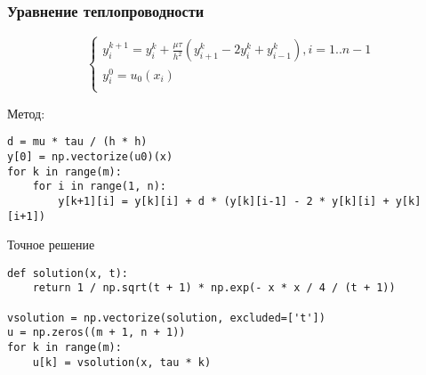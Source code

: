 \documentclass[10pt]{beamer}
\begin{document}
\begin{frame}[fragile]
\frametitle{Уравнение теплопроводности}
$$
\begin{cases}
y^{k+1}_i = y^k_i + \frac{\mu \tau}{h^2} ( y^{k}_{i+1} - 2 y^k_i + y^{k}_{i-1}), i = 1..n-1\\
y_i^0 = u_0(x_i)\\
\end{cases}
$$

Метод:
\begin{lstlisting}
d = mu * tau / (h * h) 
y[0] = np.vectorize(u0)(x)
for k in range(m):
    for i in range(1, n):
        y[k+1][i] = y[k][i] + d * (y[k][i-1] - 2 * y[k][i] + y[k][i+1])
\end{lstlisting}

Точное решение
\begin{lstlisting}
def solution(x, t):
    return 1 / np.sqrt(t + 1) * np.exp(- x * x / 4 / (t + 1))

vsolution = np.vectorize(solution, excluded=['t'])
u = np.zeros((m + 1, n + 1))
for k in range(m):
	u[k] = vsolution(x, tau * k)
\end{lstlisting}
\end{frame}
\end{document}
